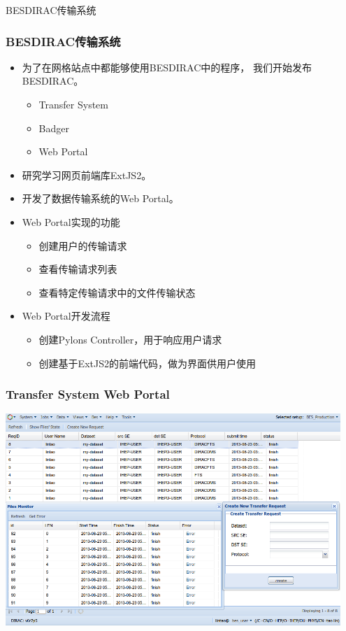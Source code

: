 \begin{frame}
    \begin{center}
        \LARGE BESDIRAC传输系统
    \end{center}
\end{frame}

\begin{frame}
    \frametitle{BESDIRAC传输系统}
    \begin{itemize}
        \item 为了在网格站点中都能够使用BESDIRAC中的程序，
              我们开始发布BESDIRAC。
            \begin{itemize}
                \item Transfer System
                \item Badger
                \item Web Portal
            \end{itemize}
        \item 研究学习网页前端库ExtJS2。
        \item 开发了数据传输系统的Web Portal。
        \item Web Portal实现的功能
            \begin{itemize}
                \item 创建用户的传输请求
                \item 查看传输请求列表
                \item 查看特定传输请求中的文件传输状态
            \end{itemize}
        \item Web Portal开发流程
            \begin{itemize}
                \item 创建Pylons Controller，用于响应用户请求
                \item 创建基于ExtJS2的前端代码，做为界面供用户使用
            \end{itemize}
    \end{itemize}
\end{frame}

\begin{frame}
    \frametitle{Transfer System Web Portal}
    \includegraphics[height=8cm,keepaspectratio]{data/besdirac-transfer-req.png}
\end{frame}
